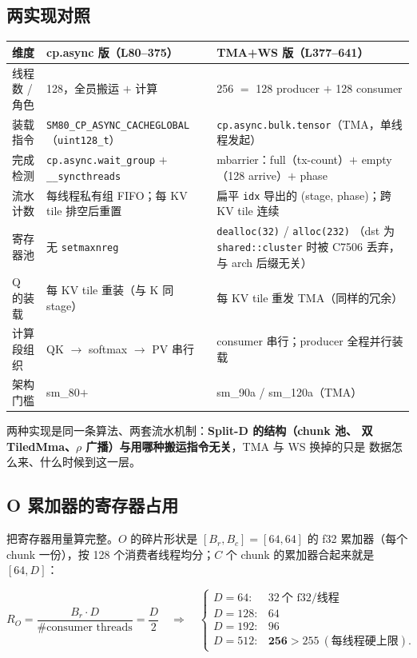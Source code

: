 \subsection{两实现对照}

\begin{center}
\begin{tabular}{p{3.4cm}p{4.6cm}p{5.2cm}}
\toprule
维度 & cp.async 版（L80--375） & TMA+WS 版（L377--641） \\
\midrule
线程数 / 角色 & 128，全员搬运 $+$ 计算 & 256 $=$ 128 producer $+$ 128 consumer \\
装载指令 & \texttt{SM80\_CP\_}\allowbreak\texttt{ASYNC\_}\allowbreak\texttt{CACHEGLOBAL}（\texttt{uint128\_t}） &
  \texttt{cp.async.}\allowbreak\texttt{bulk.}\allowbreak\texttt{tensor}（TMA，单线程发起） \\
完成检测 & \texttt{cp.\allowbreak{}async.\allowbreak{}wait\_\allowbreak{}group} $+$ \texttt{\_\allowbreak{}\_\allowbreak{}syncthreads} &
  mbarrier：full（tx-count）$+$ empty（128 arrive）$+$ phase \\
流水计数 & 每线程私有组 FIFO；每 KV tile 排空后重置 &
  扁平 \texttt{idx} 导出的 (stage, phase)；跨 KV tile 连续 \\
寄存器池 & 无 \texttt{setmaxnreg} & \texttt{dealloc(32)} / \texttt{alloc(232)}
  （dst 为 \texttt{shared::cluster} 时被 C7506 丢弃，与 arch 后缀无关） \\
Q 的装载 & 每 KV tile 重装（与 K 同 stage） & 每 KV tile 重发 TMA（同样的冗余） \\
计算段组织 & QK $\to$ softmax $\to$ PV 串行 & consumer 串行；producer 全程并行装载 \\
架构门槛 & sm\_80$+$ & sm\_90a / sm\_120a（TMA） \\
\bottomrule
\end{tabular}
\end{center}

两种实现是同一条算法、两套流水机制：\textbf{Split-D 的结构（chunk 池、
双 TiledMma、$\rho$ 广播）与用哪种搬运指令无关}，TMA 与 WS 换掉的只是
数据怎么来、什么时候到这一层。

\subsection{O 累加器的寄存器占用}

把寄存器用量算完整。$O$ 的碎片形状是 $[B_r, B_c] = [64,64]$ 的 f32 累加器（每个 chunk
一份），按 128 个消费者线程均分；$C$ 个 chunk 的累加器合起来就是 $[64, D]$：

\begin{equation}
  R_O = \frac{B_r \cdot D}{\#\text{consumer threads}} = \frac{D}{2}
  \quad\Longrightarrow\quad
  \begin{cases}
    D = 64: & 32\ \text{个 f32/线程} \\
    D = 128: & 64 \\
    D = 192: & 96 \\
    D = 512: & \mathbf{256} > 255\ (\text{每线程硬上限}) .
  \end{cases}
  \label{eq:19-oacc}
\end{equation}


